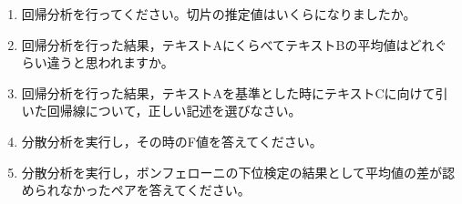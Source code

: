 \begin{enumerate}
	\item 回帰分析を行ってください。切片の推定値はいくらになりましたか。
	\item 回帰分析を行った結果，テキストAにくらべてテキストBの平均値はどれぐらい違うと思われますか。
	\item 回帰分析を行った結果，テキストAを基準とした時にテキストCに向けて引いた回帰線について，正しい記述を選びなさい。
	\item 分散分析を実行し，その時のF値を答えてください。
	\item 分散分析を実行し，ボンフェローニの下位検定の結果として平均値の差が認められなかったペアを答えてください。
\end{enumerate}
